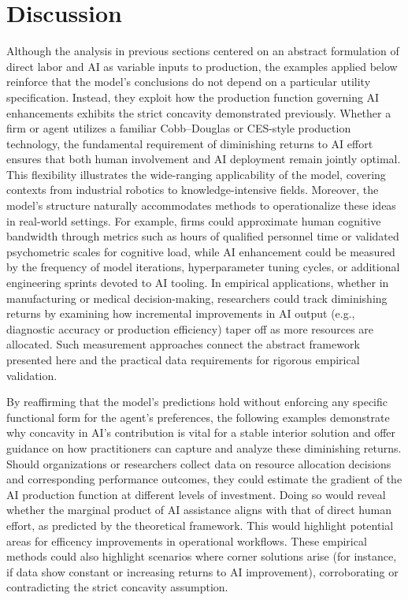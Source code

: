 \documentclass[11pt]{article}
\theoremstyle{definition}
\theoremstyle{remark}
\begin{document}
\section{Discussion}
\label{sec:dis}
Although the analysis in previous sections centered on an abstract formulation of direct labor and AI as variable inputs to production, the examples applied below reinforce that the model’s conclusions do not depend on a particular utility specification. Instead, they exploit how the production function governing AI enhancements exhibits the strict concavity demonstrated previously. Whether a firm or agent utilizes a familiar Cobb–Douglas or CES-style production technology, the fundamental requirement of diminishing returns to AI effort ensures that both human involvement and AI deployment remain jointly optimal. This flexibility illustrates the wide-ranging applicability of the model, covering contexts from industrial robotics to knowledge-intensive fields. Moreover, the model’s structure naturally accommodates methods to operationalize these ideas in real-world settings. For example, firms could approximate human cognitive bandwidth through metrics such as hours of qualified personnel time or validated psychometric scales for cognitive load, while AI enhancement could be measured by the frequency of model iterations, hyperparameter tuning cycles, or additional engineering sprints devoted to AI tooling. In empirical applications, whether in manufacturing or medical decision-making, researchers could track diminishing returns by examining how incremental improvements in AI output (e.g., diagnostic accuracy or production efficiency) taper off as more resources are allocated. Such measurement approaches connect the abstract framework presented here and the practical data requirements for rigorous empirical validation.

By reaffirming that the model’s predictions hold without enforcing any specific functional form for the agent’s preferences, the following examples demonstrate why concavity in AI’s contribution is vital for a stable interior solution and offer guidance on how practitioners can capture and analyze these diminishing returns. Should organizations or researchers collect data on resource allocation decisions and corresponding performance outcomes, they could estimate the gradient of the AI production function at different levels of investment. Doing so would reveal whether the marginal product of AI assistance aligns with that of direct human effort, as predicted by the theoretical framework. This would highlight potential areas for efficency improvements in operational workflows. These empirical methods could also highlight scenarios where corner solutions arise (for instance, if data show constant or increasing returns to AI improvement), corroborating or contradicting the strict concavity assumption.
\end{document}
